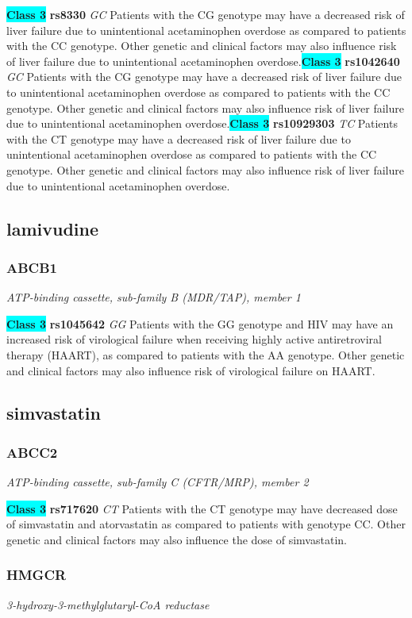 \documentclass{report}
\begin{document}
\textbf{\colorbox{cyan} {Class 3}} \textbf{ rs8330 } \textit{ GC }
Patients with the CG genotype may have a decreased risk of liver failure due to unintentional acetaminophen overdose as compared to patients with the CC genotype. Other genetic and clinical factors may also influence risk of liver failure due to unintentional acetaminophen overdose.\newline\textbf{\colorbox{cyan} {Class 3}} \textbf{ rs1042640 } \textit{ GC }
Patients with the CG genotype may have a decreased risk of liver failure due to unintentional acetaminophen overdose as compared to patients with the CC genotype. Other genetic and clinical factors may also influence risk of liver failure due to unintentional acetaminophen overdose.\newline\textbf{\colorbox{cyan} {Class 3}} \textbf{ rs10929303 } \textit{ TC }
Patients with the CT genotype may have a decreased risk of liver failure due to unintentional acetaminophen overdose as compared to patients with the CC genotype. Other genetic and clinical factors may also influence risk of liver failure due to unintentional acetaminophen overdose.\newline\subsection{ lamivudine }\subsubsection{ ABCB1 }
\textit{ ATP-binding cassette, sub-family B (MDR/TAP), member 1 }

\textbf{\colorbox{cyan} {Class 3}} \textbf{ rs1045642 } \textit{ GG }
Patients with the GG genotype and HIV may have an increased risk of virological failure when receiving highly active antiretroviral therapy (HAART), as compared to patients with the AA genotype. Other genetic and clinical factors may also influence risk of virological failure on HAART.\newline\subsection{ simvastatin }\subsubsection{ ABCC2 }
\textit{ ATP-binding cassette, sub-family C (CFTR/MRP), member 2 }

\textbf{\colorbox{cyan} {Class 3}} \textbf{ rs717620 } \textit{ CT }
Patients with the CT genotype may have decreased dose of simvastatin and atorvastatin as compared to patients with genotype CC. Other genetic and clinical factors may also influence the dose of simvastatin.\newline\subsubsection{ HMGCR }
\textit{ 3-hydroxy-3-methylglutaryl-CoA reductase }
\end{document}
